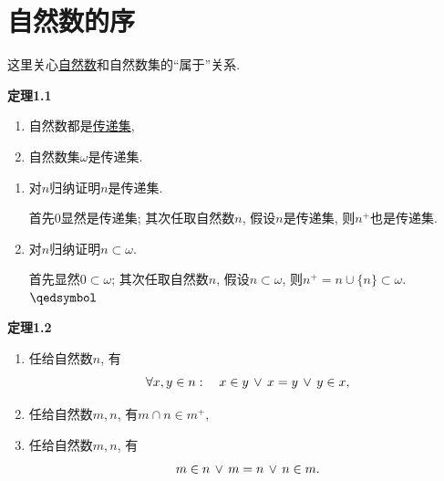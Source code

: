 \documentclass[UTF8]{ctexart}
\begin{document}
\setlength{\abovedisplayskip}{1pt}
\setlength{\belowdisplayskip}{1pt}

\section{自然数的序}

这里关心\href{01 自然数#nameddest=sec:定义1.3}{自然数}和自然数集的``属于''关系.

\vspace{10pt}

\hypertarget{sec:定理1.1}{}
\noindent\textbf{定理1.1}

\begin{enumerate}
    \item 自然数都是\href{02 传递集#nameddest=sec:定义1.1}{传递集},
    \item 自然数集$\omega$是传递集.
\end{enumerate}


\begin{enumerate}
    \item 对$n$归纳证明$n$是传递集.
    
    \hspace{2.17em}
    首先$0$显然是传递集; 其次任取自然数$n$, 假设$n$是传递集,
    则$n^+$也是传递集.

    \item 对$n$归纳证明$n\subset\omega$.
    
    \hspace{2.17em}
    首先显然$0\subset\omega$; 其次任取自然数$n$, 假设$n\subset\omega$,
    则$n^+=n\cup\{n\}\subset\omega$. \hfill $\qedsymbol$
\end{enumerate}

\vspace{10pt}

\hypertarget{sec:定理1.2}{}
\noindent\textbf{定理1.2}

\begin{enumerate}
    \item 任给自然数$n$, 有
    \[
        \forall x,y\in n:\quad x\in y\,\lor\,x=y\,\lor\,y\in x,\\[-6pt]
    \]
    \item 任给自然数$m,n$, 有$m\cap n\in m^+$,
    \item 任给自然数$m,n$, 有
    \[
        m\in n\,\lor\,m=n\,\lor\,n\in m.\\[-3pt]
    \]
\end{enumerate}
\end{document}
